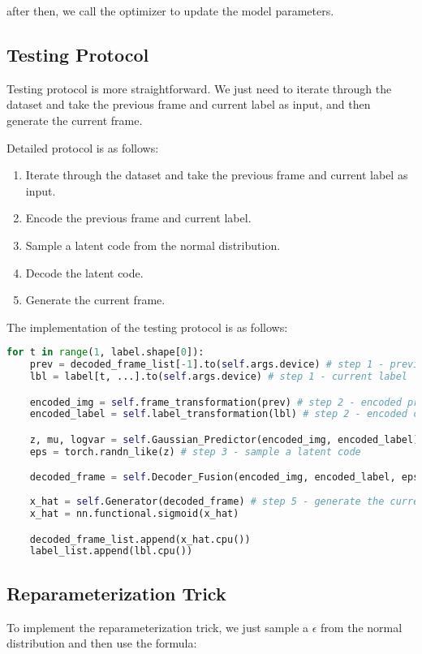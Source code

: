after then, we call the optimizer to update the model parameters.

\subsection{Testing Protocol}
Testing protocol is more straightforward. We just need to iterate through the dataset and take the previous frame and current label as input, and then generate the current frame.

Detailed protocol is as follows:
\begin{enumerate}
    \item Iterate through the dataset and take the previous frame and current label as input.
    \item Encode the previous frame and current label.
    \item Sample a latent code from the normal distribution.
    \item Decode the latent code.
    \item Generate the current frame.
\end{enumerate}

The implementation of the testing protocol is as follows:

\begin{lstlisting}[language=Python]
for t in range(1, label.shape[0]):
    prev = decoded_frame_list[-1].to(self.args.device) # step 1 - previous frame
    lbl = label[t, ...].to(self.args.device) # step 1 - current label

    encoded_img = self.frame_transformation(prev) # step 2 - encoded previous frame
    encoded_label = self.label_transformation(lbl) # step 2 - encoded current label

    z, mu, logvar = self.Gaussian_Predictor(encoded_img, encoded_label)
    eps = torch.randn_like(z) # step 3 - sample a latent code

    decoded_frame = self.Decoder_Fusion(encoded_img, encoded_label, eps) # step 4 - decode the latent code
    
    x_hat = self.Generator(decoded_frame) # step 5 - generate the current frame
    x_hat = nn.functional.sigmoid(x_hat)

    decoded_frame_list.append(x_hat.cpu())
    label_list.append(lbl.cpu())
\end{lstlisting}

\subsection{Reparameterization Trick}
To implement the reparameterization trick, we just sample a $\epsilon$ from the normal distribution and then use the formula:

